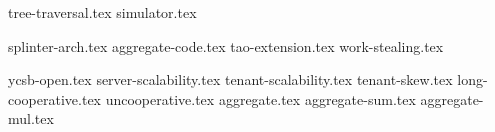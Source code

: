  {tree-traversal.tex}
 {simulator.tex}

\clearpage

 {splinter-arch.tex}
 {aggregate-code.tex}
 {tao-extension.tex}
 {work-stealing.tex}

\clearpage

 {ycsb-open.tex}
 {server-scalability.tex}
 {tenant-scalability.tex}
 {tenant-skew.tex}
 {long-cooperative.tex}
 {uncooperative.tex}
 {aggregate.tex}
 {aggregate-sum.tex}
 {aggregate-mul.tex}

